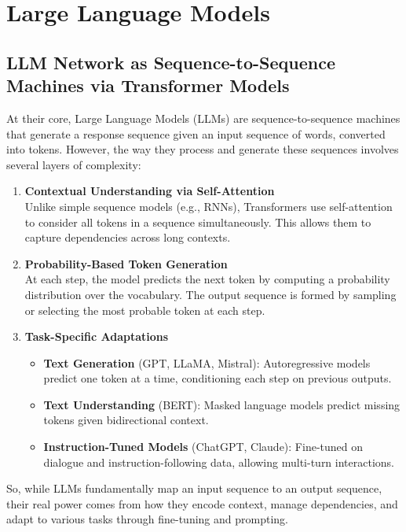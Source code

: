 
\chapter{Large Language Models}

\section{LLM Network as Sequence-to-Sequence Machines via Transformer Models}

At their core, Large Language Models (LLMs) are sequence-to-sequence machines that generate a response sequence given an input sequence of words, converted into tokens. However, the way they process and generate these sequences involves several layers of complexity:

\begin{enumerate}
    \item \textbf{Contextual Understanding via Self-Attention} \\
    Unlike simple sequence models (e.g., RNNs), Transformers use self-attention to consider all tokens in a sequence simultaneously. This allows them to capture dependencies across long contexts.

    \item \textbf{Probability-Based Token Generation} \\
    At each step, the model predicts the next token by computing a probability distribution over the vocabulary. The output sequence is formed by sampling or selecting the most probable token at each step.

    \item \textbf{Task-Specific Adaptations}
    \begin{itemize}
        \item \textbf{Text Generation} (GPT, LLaMA, Mistral): Autoregressive models predict one token at a time, conditioning each step on previous outputs.
        \item \textbf{Text Understanding} (BERT): Masked language models predict missing tokens given bidirectional context.
        \item \textbf{Instruction-Tuned Models} (ChatGPT, Claude): Fine-tuned on dialogue and instruction-following data, allowing multi-turn interactions.
    \end{itemize}
\end{enumerate}

So, while LLMs fundamentally map an input sequence to an output sequence, their real power comes from how they encode context, manage dependencies, and adapt to various tasks through fine-tuning and prompting.

